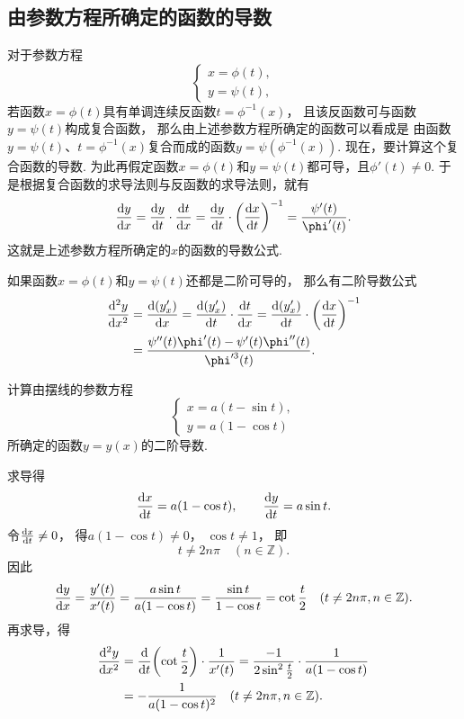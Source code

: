 \subsection{由参数方程所确定的函数的导数}
对于参数方程\[
	\left\{ \begin{array}{l}
		x = \phi(t), \\
		y = \psi(t),
	\end{array} \right.
\]
若函数\(x = \phi(t)\)具有单调连续反函数\(t=\phi^{-1}(x)\)，
且该反函数可与函数\(y = \psi(t)\)构成复合函数，
那么由上述参数方程所确定的函数可以看成是
由函数\(y=\psi(t)\)、\(t=\phi^{-1}(x)\)复合而成的函数\(y=\psi(\phi^{-1}(x))\).
现在，要计算这个复合函数的导数.
为此再假定函数\(x = \phi(t)\)和\(y = \psi(t)\)都可导，且\(\phi'(t) \neq 0\).
于是根据复合函数的求导法则与反函数的求导法则，就有\begin{equation}
	\dv{y}{x} = \dv{y}{t} \cdot \dv{t}{x}
	= \dv{y}{t} \cdot \left(\dv{x}{t}\right)^{-1}
	= \frac{\psi'(t)}{\phi'(t)}.
\end{equation}
这就是上述参数方程所确定的\(x\)的函数的导数公式.

如果函数\(x = \phi(t)\)和\(y = \psi(t)\)还都是二阶可导的，
那么有二阶导数公式
\begin{equation}
	\begin{split}
		\dv[2]{y}{x}
		&= \dv{(y'_x)}{x}
		= \dv{(y'_x)}{t} \cdot \dv{t}{x}
		= \dv{(y'_x)}{t} \cdot \left(\dv{x}{t}\right)^{-1} \\
		&= \frac{\psi''(t) \phi'(t) - \psi'(t) \phi''(t)}{\phi'^3(t)}.
	\end{split}
\end{equation}

\begin{example}
计算由摆线的参数方程\[
	\left\{ \begin{array}{l}
		x=a(t-\sin t), \\
		y=a(1-\cos t)
	\end{array} \right.
\]所确定的函数\(y=y(x)\)的二阶导数.
\begin{solution}
求导得\[
	\dv{x}{t}=a(1-\cos t), \qquad
	\dv{y}{t}=a\sin t.
\]
令\(\dv{x}{t}\neq0\)，
得\(a(1-\cos t)\neq0\)，
\(\cos t\neq1\)，
即\[
	t\neq 2n\pi
	\quad(n\in\mathbb{Z}).
\]
因此\[
	\dv{y}{x}
	=\frac{y'(t)}{x'(t)}
	=\frac{a\sin t}{a(1-\cos t)}
	=\frac{\sin t}{1-\cos t}
	=\cot\frac{t}{2}
	\quad(t\neq 2n\pi,n\in\mathbb{Z}).
\]
再求导，得\begin{align*}
	\dv[2]{y}{x}
	&=\dv{t}(\cot\frac{t}{2})\cdot\frac{1}{x'(t)}
	=\frac{-1}{2\sin^2\frac{t}{2}}
	\cdot\frac{1}{a(1-\cos t)} \\
	&=-\frac{1}{a(1-\cos t)^2}
	\quad(t\neq 2n\pi,n\in\mathbb{Z}).
\end{align*}
\end{solution}
\end{example}


